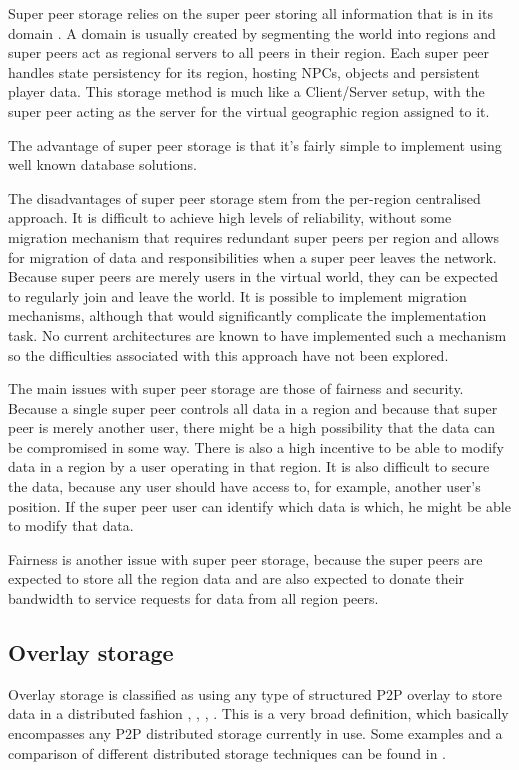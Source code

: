 \documentclass[10pt,a4paper,conference]{IEEEtran}
\begin{document}
Super peer storage relies on the super peer storing all information that is in its domain \cite{knutsson_p2p_first}. A domain is usually created by
segmenting the world into regions and super peers act as regional servers to all peers in their region. Each super peer handles state persistency for
its region, hosting NPCs, objects and persistent player data. This storage method is much like a Client/Server setup, with the super peer acting as
the server for the virtual geographic region assigned to it.

The advantage of super peer storage is that it's fairly simple to implement using well known database solutions.

The disadvantages of super peer storage stem from the per-region centralised approach. It is difficult to achieve high levels of reliability, without
some migration mechanism that requires redundant super peers per region and allows for migration of data and responsibilities when a super peer
leaves the network. Because super peers are merely users in the virtual world, they can be expected to regularly join and leave the world. It is
possible to implement migration mechanisms, although that would significantly complicate the implementation task. No current architectures are known
to have implemented such a mechanism so the difficulties associated with this approach have not been explored.

The main issues with super peer storage are those of fairness and security. Because a single super peer controls all data in a region and because
that super peer is merely another user, there might be a high possibility that the data can be compromised in some way. There is also a high
incentive to be able to modify data in a region by a user operating in that region. It is also difficult to secure the data, because any user should
have access to, for example, another user's position. If the super peer user can identify which data is which, he might be able to modify that data.

Fairness is another issue with super peer storage, because the super peers are expected to store all the region data and are also expected to donate
their bandwidth to service requests for data from all region peers.


\subsection{Overlay storage}

Overlay storage is classified as using any type of structured P2P overlay to store data in a distributed fashion \cite{Douglas05enablingmassively},
\cite{using_freenet_storage}, \cite{Fan_phd}, \cite{past_storage_focus}. This is a very broad definition, which basically encompasses any P2P
distributed storage currently in use. Some examples and a comparison of different distributed storage techniques can be found in
\cite{Hasan_distributed_storage_survey}.
\end{document}
